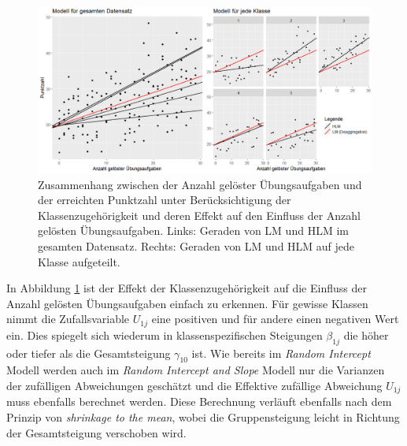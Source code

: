 \documentclass[12pt]{article}\usepackage[]{graphicx}\usepackage[]{color}
\begin{document}
\begin{figure}[t!]
\centering
\includegraphics[width = \textwidth]{random_intercept_slope}
\caption{Zusammenhang zwischen der Anzahl gelöster Übungsaufgaben und der erreichten Punktzahl unter Berücksichtigung der Klassenzugehörigkeit und deren Effekt auf den Einfluss der Anzahl gelösten Übungsaufgaben. Links: Geraden von LM und HLM im gesamten Datensatz. Rechts: Geraden von LM und HLM auf jede Klasse aufgeteilt.}
\label{fig:random_intercept_slope}
\end{figure}

In Abbildung \ref{fig:random_intercept_slope} ist der Effekt der Klassenzugehörigkeit auf die Einfluss der Anzahl gelösten Übungsaufgaben einfach zu erkennen. Für gewisse Klassen nimmt die Zufallsvariable $U_{1j}$ eine positiven und für andere einen negativen Wert ein. Dies spiegelt sich wiederum in klassenspezifischen Steigungen $\beta_{1j}$ die höher oder tiefer als die Gesamtsteigung $\gamma_{10}$ ist. Wie bereits im \textit{Random Intercept} Modell werden auch im \textit{Random Intercept and Slope} Modell nur die Varianzen der zufälligen Abweichungen geschätzt und die Effektive zufällige Abweichung $U_{1j}$ muss ebenfalls berechnet werden. Diese Berechnung verläuft ebenfalls nach dem Prinzip von \textit{shrinkage to the mean}, wobei die Gruppensteigung leicht in Richtung der Gesamtsteigung verschoben wird.
\end{document}
